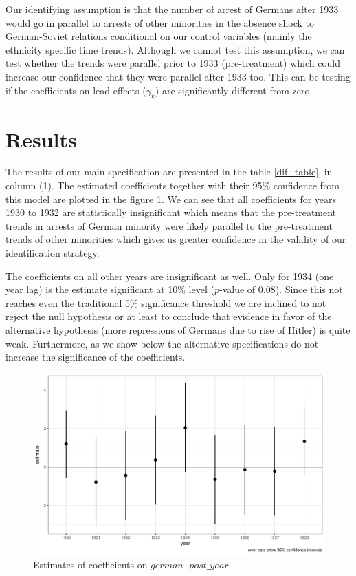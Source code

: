 \documentclass[11pt]{article}
\begin{document}
Our identifying assumption is that the number of arrest of Germans after 1933 would go in parallel to arrests of other minorities in the absence shock to German-Soviet relations conditional on our control variables (mainly the ethnicity specific time trends). Although we cannot test this assumption, we can test whether the trends were parallel prior to 1933 (pre-treatment) which could increase our confidence that they were parallel after 1933 too. This can be testing if the coefficients on lead effects ($\gamma_k$) are significantly different from zero.  
\section{Results}
The results of our main specification are presented in the table \ref{dif_table}, in column (1). The estimated coefficients together with their 95\% confidence  from this model are plotted in the figure \ref{fig_did_effets}. We can see that all coefficients for years 1930 to 1932 are statistically insignificant which means that the pre-treatment trends in arrests of German minority were likely parallel to the pre-treatment trends of other minorities which gives us greater  confidence in the validity of our identification strategy. 

The coefficients on all other years are insignificant as well. Only for 1934 (one year lag) is the estimate  significant at 10\% level ($p$-value of 0.08). Since this not reaches even the traditional 5\% significance threshold we are inclined to not reject the null hypothesis or at least to conclude that evidence in favor of the alternative hypothesis (more repressions of Germans due to rise of Hitler) is quite weak.  Furthermore, as we show below the alternative specifications do not increase the significance of the coefficients.
\begin{figure}[h]
\centering
\includegraphics[width=\textwidth]{plots/did_effects.pdf}
\caption{Estimates of coefficients on $german \cdot post\_year$}
\label{fig_did_effets}
\end{figure}
\end{document}
